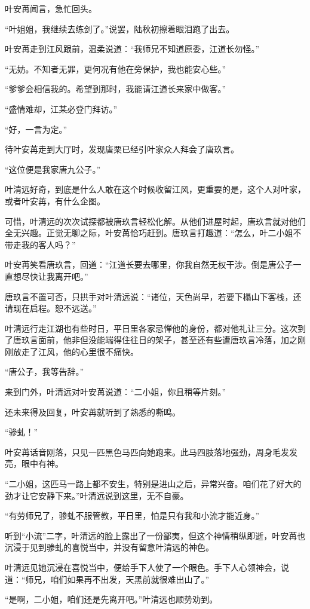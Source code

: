 叶安苒闻言，急忙回头。

“叶姐姐，我继续去练剑了。”说罢，陆秋初擦着眼泪跑了出去。

叶安苒走到江风跟前，温柔说道：“我师兄不知道原委，江道长勿怪。”

“无妨。不知者无罪，更何况有他在旁保护，我也能安心些。”

“爹爹会相信我的。希望到那时，我能请江道长来家中做客。”

“盛情难却，江某必登门拜访。”

“好，一言为定。”

待叶安苒走到大厅时，发现唐栗已经引叶家众人拜会了唐玖言。

“这位便是我家唐九公子。”

叶清远好奇，到底是什么人敢在这个时候收留江风，更重要的是，这个人对叶家，或者叶安苒，有什么企图。

可惜，叶清远的次次试探都被唐玖言轻松化解。从他们进屋时起，唐玖言就对他们全无兴趣。正觉无聊之际，叶安苒恰巧赶到。唐玖言打趣道：“怎么，叶二小姐不带走我的客人吗？”

叶安苒笑看唐玖言，回道：“江道长要去哪里，你我自然无权干涉。倒是唐公子一直想尽快让我离开吧。”

唐玖言不置可否，只拱手对叶清远说：“诸位，天色尚早，若要下榻山下客栈，还请现在启程。恕不远送。”

叶清远行走江湖也有些时日，平日里各家忌惮他的身份，都对他礼让三分。这次到了唐玖言面前，他非但没能端得住往日的架子，甚至还有些遭唐玖言冷落，加之刚刚放走了江风，他的心里很不痛快。

“唐公子，我等告辞。”

来到门外，叶清远对叶安苒说道：“二小姐，你且稍等片刻。”

还未来得及回复，叶安苒就听到了熟悉的嘶鸣。

“骖虬！”

叶安苒话音刚落，只见一匹黑色马匹向她跑来。此马四肢落地强劲，周身毛发发亮，眼中有神。

“二小姐，这匹马一路上都不安生，特别是进山之后，异常兴奋。咱们花了好大的劲才让它安静下来。”叶清远说到这里，无不自豪。

“有劳师兄了，骖虬不服管教，平日里，怕是只有我和小流才能近身。”

听到“小流”二字，叶清远的脸上露出了一份鄙夷，但这个神情稍纵即逝，叶安苒也沉浸于见到骖虬的喜悦当中，并没有留意叶清远的神色。

叶清远见她沉浸在喜悦当中，便给手下人使了一个眼色。手下人心领神会，说道：“师兄，咱们如果再不出发，天黑前就很难出山了。”

“是啊，二小姐，咱们还是先离开吧。”叶清远也顺势劝到。

